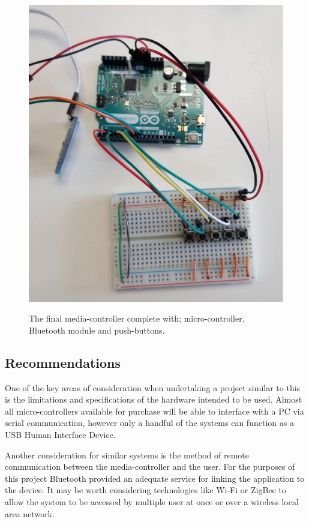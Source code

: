 \documentclass{article}
\begin{document}
				\begin{figure}[h]
					\centering
					\label{fullSystem}
					{\includegraphics[scale = 0.5]{fullSystem}}
					\caption{The final media-controller complete with; micro-controller, Bluetooth module and push-buttons.}
				\end{figure}
			
		\subsection{Recommendations}
			One of the key areas of consideration when undertaking a project similar to this is the  limitations and specifications of the hardware intended to be used. Almost all micro-controllers available for purchase will be able to interface with a PC via serial communication, however only a handful of the systems can function as a USB Human Interface Device.
			
			Another consideration for similar systems is the method of remote communication between the media-controller and the user. For the purposes of this project Bluetooth provided an adequate service for linking the application to the device. It may be worth considering technologies like Wi-Fi or ZigBee to allow the system to be accessed by multiple user at once or over a wireless local area network. 
			
\end{document}
